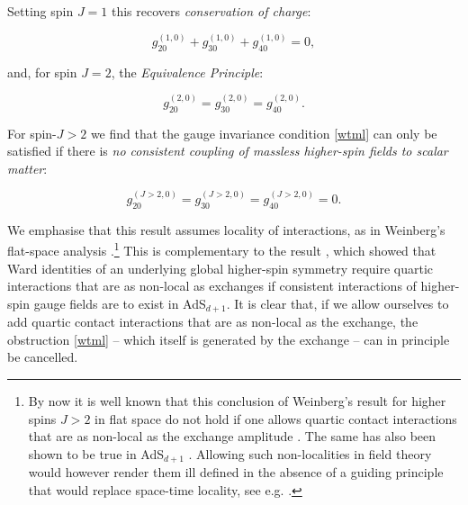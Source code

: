 \documentclass[11pt,a4paper]{article}
\begin{document}
Setting spin $J=1$ this recovers \emph{conservation of charge}:
\begin{shaded}
\begin{equation}\label{cc}
    g^{\left(1,0\right)}_{20}+g^{\left(1,0\right)}_{30}+g^{\left(1,0\right)}_{40}=0,
\end{equation}
\end{shaded}
\noindent and, for spin $J=2$, the \emph{Equivalence Principle}:
\begin{shaded}
\begin{equation}\label{ep}
    g^{\left(2,0\right)}_{20}=g^{\left(2,0\right)}_{30}=g^{\left(2,0\right)}_{40}.
\end{equation}
\end{shaded}
 \noindent For spin-$J>2$ we find that the gauge invariance condition \eqref{wtml} can only be satisfied if there is \emph{no consistent coupling of massless higher-spin fields to scalar matter}:
 \begin{shaded}
\begin{equation}
    g^{\left(J>2,0\right)}_{20}=g^{\left(J>2,0\right)}_{30}=g^{\left(J>2,0\right)}_{40}=0.\label{hsconstr}
\end{equation} 
 \end{shaded}
\noindent We emphasise that this result assumes locality of interactions, as in Weinberg's flat-space analysis \cite{Weinberg:1964ew}.\footnote{By now it is well known that this conclusion of Weinberg's result for higher spins $J>2$ in flat space do not hold if one allows quartic contact interactions that are as non-local as the exchange amplitude \cite{Taronna:2011kt}. The same has also been shown to be true in AdS$_{d+1}$ \cite{Sleight:2017pcz}. Allowing such non-localities in field theory would however render them ill defined in the absence of a guiding principle that would replace space-time locality, see e.g. \cite{Barnich:1993vg}.} This is complementary to the result \cite{Sleight:2017pcz}, which showed that Ward identities of an underlying global higher-spin symmetry require quartic interactions that are as non-local as exchanges if consistent interactions of higher-spin gauge fields are to exist in AdS$_{d+1}$. It is clear that, if we allow ourselves to add quartic contact interactions that are as non-local as the exchange, the obstruction \eqref{wtml} -- which itself is generated by the exchange -- can in principle be cancelled. 
\end{document}
